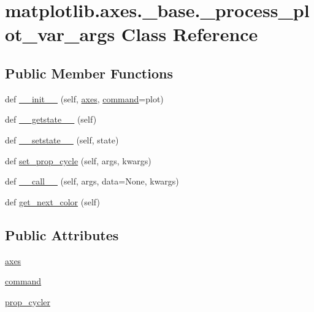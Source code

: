 \hypertarget{classmatplotlib_1_1axes_1_1__base_1_1__process__plot__var__args}{}\section{matplotlib.\+axes.\+\_\+base.\+\_\+process\+\_\+plot\+\_\+var\+\_\+args Class Reference}
\label{classmatplotlib_1_1axes_1_1__base_1_1__process__plot__var__args}
\subsection*{Public Member Functions}
\begin{DoxyCompactItemize}
\item 
def \hyperlink{classmatplotlib_1_1axes_1_1__base_1_1__process__plot__var__args_a8635cc9d07225f9f3dcf315335b0d400}{\+\_\+\+\_\+init\+\_\+\+\_\+} (self, \hyperlink{classmatplotlib_1_1axes_1_1__base_1_1__process__plot__var__args_a26c6cebacb507f97c804f89502b165f0}{axes}, \hyperlink{classmatplotlib_1_1axes_1_1__base_1_1__process__plot__var__args_afffcb0102cf55e1f11ee12170783ebe9}{command}=\textquotesingle{}plot\textquotesingle{})
\item 
def \hyperlink{classmatplotlib_1_1axes_1_1__base_1_1__process__plot__var__args_a4510721cb42ea18202e7e94d80788280}{\+\_\+\+\_\+getstate\+\_\+\+\_\+} (self)
\item 
def \hyperlink{classmatplotlib_1_1axes_1_1__base_1_1__process__plot__var__args_a2acb61735045109ae3e24230fb276de6}{\+\_\+\+\_\+setstate\+\_\+\+\_\+} (self, state)
\item 
def \hyperlink{classmatplotlib_1_1axes_1_1__base_1_1__process__plot__var__args_a0a89f0130df3b9ada848d8238d3fdf40}{set\+\_\+prop\+\_\+cycle} (self, args, kwargs)
\item 
def \hyperlink{classmatplotlib_1_1axes_1_1__base_1_1__process__plot__var__args_a9c021c54968824d2d1c47cc917d51960}{\+\_\+\+\_\+call\+\_\+\+\_\+} (self, args, data=None, kwargs)
\item 
def \hyperlink{classmatplotlib_1_1axes_1_1__base_1_1__process__plot__var__args_a9eacd6d5cc88dfb8f2de05b7f66dfacc}{get\+\_\+next\+\_\+color} (self)
\end{DoxyCompactItemize}
\subsection*{Public Attributes}
\begin{DoxyCompactItemize}
\item 
\hyperlink{classmatplotlib_1_1axes_1_1__base_1_1__process__plot__var__args_a26c6cebacb507f97c804f89502b165f0}{axes}
\item 
\hyperlink{classmatplotlib_1_1axes_1_1__base_1_1__process__plot__var__args_afffcb0102cf55e1f11ee12170783ebe9}{command}
\item 
\hyperlink{classmatplotlib_1_1axes_1_1__base_1_1__process__plot__var__args_a4fb75bb0b2ea3e3d53e0e2d0c5ecdd4f}{prop\+\_\+cycler}
\end{DoxyCompactItemize}


